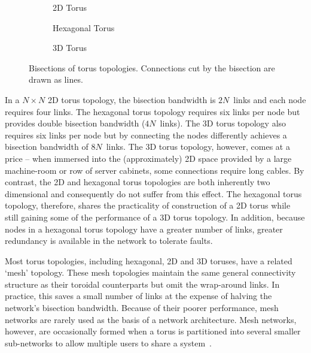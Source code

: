 		\begin{figure}
			\center
			\begin{subfigure}[b]{0.3\linewidth}
				\center
				
				\caption{2D Torus}
				\label{fig:bisection-bandwidth-2d}
			\end{subfigure}
			\begin{subfigure}[b]{0.3\linewidth}
				\center
				
				\caption{Hexagonal Torus}
				\label{fig:bisection-bandwidth-hex}
			\end{subfigure}
			\begin{subfigure}[b]{0.3\linewidth}
				\center
				
				\caption{3D Torus}
				\label{fig:bisection-bandwidth-3d}
			\end{subfigure}
			
			\caption[Bisections of torus topologies.]%
			{Bisections of torus topologies. Connections cut by the bisection
			are drawn as lines.}
			\label{fig:bisection-bandwidth}
		\end{figure}
		
		In a $N \times N$ 2D torus topology, the bisection bandwidth is $2N$~links
		and each node requires four links. The hexagonal torus topology requires
		six links per node but provides double bisection bandwidth ($4N$~links).
		The 3D torus topology also requires six links per node but by connecting
		the nodes differently achieves a bisection bandwidth of $8N$~links.  The 3D
		torus topology, however, comes at a price -- when immersed into the
		(approximately) 2D space provided by a large machine-room or row of server
		cabinets, some connections require long cables. By contrast, the 2D and
		hexagonal torus topologies are both inherently two dimensional and
		consequently do not suffer from this effect. The hexagonal torus topology,
		therefore, shares the practicality of construction of a 2D torus while
		still gaining some of the performance of a 3D torus topology. In addition,
		because nodes in a hexagonal torus topology have a greater number of links,
		greater redundancy is available in the network to tolerate faults.
		
		Most torus topologies, including hexagonal, 2D and 3D toruses, have a
		related `mesh' topology. These mesh topologies maintain the same general
		connectivity structure as their toroidal counterparts but omit the
		wrap-around links. In practice, this saves a small number of links at the
		expense of halving the network's bisection bandwidth.  Because of their
		poorer performance, mesh networks are rarely used as the basis of a network
		architecture. Mesh networks, however, are occasionally formed when a torus
		is partitioned into several smaller sub-networks to allow multiple users to
		share a system~\cite{spalloc16}.
		
